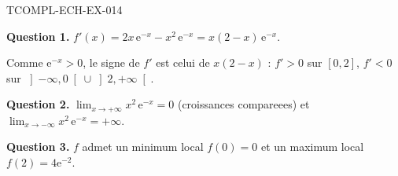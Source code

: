 \begin{corrige}{TCOMPL-ECH-EX-014}

\textbf{Question 1.} $f'(x) = 2x\,\mathrm{e}^{-x} - x^2\,\mathrm{e}^{-x} = x(2-x)\,\mathrm{e}^{-x}$.


Comme $\mathrm{e}^{-x} > 0$, le signe de $f'$ est celui de $x(2-x)$ :
$f' > 0$ sur $[0,2]$, $f' < 0$ sur $\left]-\infty,0\right[ \cup \left]2,+\infty\right[$.

\textbf{Question 2.} $\lim_{x \to +\infty} x^2\,\mathrm{e}^{-x} = 0$ (croissances compareees) et $\lim_{x \to -\infty} x^2\,\mathrm{e}^{-x} = +\infty$.

\textbf{Question 3.} $f$ admet un minimum local $f(0) = 0$ et un maximum local $f(2) = 4\mathrm{e}^{-2}$.

\end{corrige}
